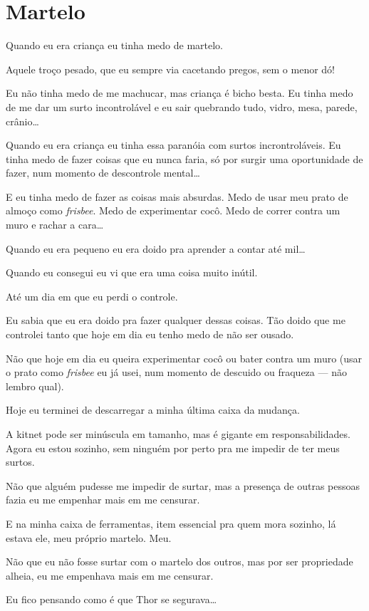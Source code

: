 \chapter{Martelo}

Quando eu era criança eu tinha medo de martelo.

Aquele troço pesado, que eu sempre via cacetando pregos, sem o menor dó!

Eu não tinha medo de me machucar, mas criança é bicho besta. Eu tinha medo de me dar um surto incontrolável e eu sair quebrando tudo, vidro, mesa, parede, crânio\ldots

Quando eu era criança eu tinha essa paranóia com surtos incrontroláveis. Eu tinha medo de fazer coisas que eu nunca faria, só por surgir uma oportunidade de fazer, num momento de descontrole mental\ldots

E eu tinha medo de fazer as coisas mais absurdas. Medo de usar meu prato de almoço como \emph{frisbee}. Medo de experimentar cocô. Medo de correr contra um muro e rachar a cara\ldots

Quando eu era pequeno eu era doido pra aprender a contar até mil\ldots

Quando eu consegui eu vi que era uma coisa muito inútil.

Até um dia em que eu perdi o controle.

Eu sabia que eu era doido pra fazer qualquer dessas coisas. Tão doido que me controlei tanto que hoje em dia eu tenho medo de não ser ousado.

Não que hoje em dia eu queira experimentar cocô ou bater contra um muro (usar o prato como \emph{frisbee} eu já usei, num momento de descuido ou fraqueza --- não lembro qual).

Hoje eu terminei de descarregar a minha última caixa da mudança.

A kitnet pode ser minúscula em tamanho, mas é gigante em responsabilidades. Agora eu estou sozinho, sem ninguém por perto pra me impedir de ter meus surtos.

Não que alguém pudesse me impedir de surtar, mas a presença de outras pessoas fazia eu me empenhar mais em me censurar.

E na minha caixa de ferramentas, item essencial pra quem mora sozinho, lá estava ele, meu próprio martelo. Meu.

Não que eu não fosse surtar com o martelo dos outros, mas por ser propriedade alheia, eu me empenhava mais em me censurar.

Eu fico pensando como é que Thor se segurava\ldots


